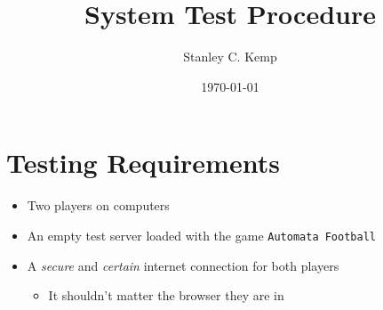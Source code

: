 \documentclass[11pt]{article}
\author{Stanley C. Kemp}
\date{\today}
\title{System Test Procedure}
\begin{document}
\maketitle
\section{Testing Requirements}
\label{sec:org20de47c}
\begin{itemize}
\item Two players on computers
\item An empty test server loaded with the game \texttt{Automata Football}
\item A \emph{secure} and \emph{certain} internet connection for both players
\begin{itemize}
\item It shouldn't matter the browser they are in
\end{itemize}
\end{itemize}
\end{document}
